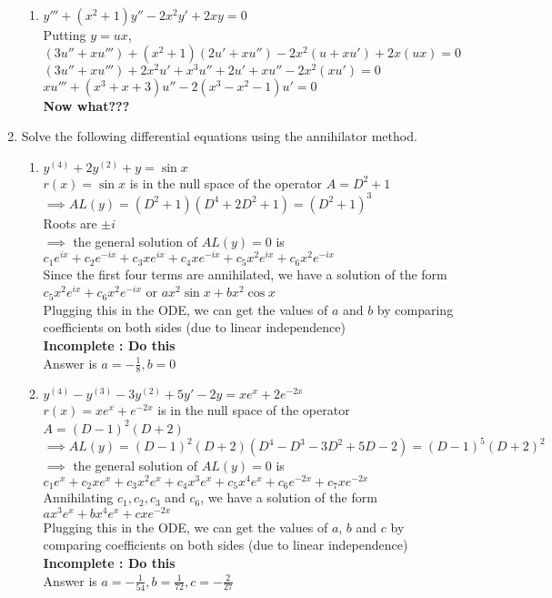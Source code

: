 \documentclass[a4paper]{article}
\begin{document}
\begin{enumerate}
\begin{enumerate}
		\item \(y''' + (x^2 + 1)y'' − 2x^2y' + 2xy = 0\)\\
		Putting $y=ux$,\\
		$(3u''+xu''') + (x^2 + 1)(2u'+xu'') − 2x^2(u+xu') + 2x(ux) = 0$
		$(3u''+xu''') + 2x^2u'+x^3u'' + 2u'+xu'' − 2x^2(xu') = 0$\\
		$xu''' + (x^3+x+3)u'' - 2(x^3 -x^2 -1)u'  = 0$\\
		\textbf{Now what???}
	\end{enumerate} 

	\item Solve the following differential equations using the annihilator method.
	\begin{enumerate}
		\item $y^{(4)}+2y^{(2)}+y=\sin x$\\
		$r(x)=\sin x$ is in the null space of the operator $A=D^2+1$\\
		$\implies AL(y)=(D^2+1)(D^4+2D^2+1)=(D^2+1)^3$\\
		Roots are $\pm i$\\
		$\implies$ the general solution of $AL(y)=0$ is\\
		$c_1e^{ix}+c_2e^{-ix}+c_3xe^{ix}+c_4xe^{-ix}+c_5x^2e^{ix}+c_6x^2e^{-ix}$\\
		Since the first four terms are annihilated, we have a solution of the form $c_5x^2e^{ix}+c_6x^2e^{-ix}$ or $ax^2\sin x+bx^2\cos x$\\
		Plugging this in the ODE, we can get the values of \(a\) and \(b\) by comparing coefficients on both sides (due to linear independence)\\
		\textbf{Incomplete : Do this}\\
		Answer is $a=-\frac{1}{8}, b=0$
		
		\item $y^{(4)}-y^{(3)}-3y^{(2)}+5y'-2y=xe^x +2e^{-2x}$\\
		$r(x)=xe^x+e^{-2x}$ is in the null space of the operator $A=(D-1)^2(D+2)$\\
		$\implies AL(y)=(D-1)^2(D+2)(D^4-D^3-3D^2+5D-2)=(D-1)^5(D+2)^2$\\
		$\implies$ the general solution of $AL(y)=0$ is\\
		$c_1e^x+c_2xe^x+c_3x^2e^x+c_4x^3e^x+c_5x^4e^x+c_6e^{-2x}+c_7xe^{-2x}$\\Annihilating $c_1,c_2,c_3$ and $c_6$, we have a solution of the form $ax^3e^x+bx^4e^x+cxe^{-2x}$\\
		Plugging this in the ODE, we can get the values of \(a\), $b$ and \(c\) by comparing coefficients on both sides (due to linear independence)\\
		\textbf{Incomplete : Do this}\\
		Answer is $a=-\frac{1}{54}, b=\frac{1}{72}, c=-\frac{2}{27}$
		

\end{enumerate}
\end{enumerate}
\end{document}
